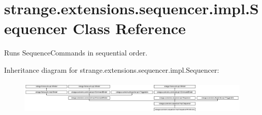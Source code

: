 \hypertarget{classstrange_1_1extensions_1_1sequencer_1_1impl_1_1_sequencer}{\section{strange.\-extensions.\-sequencer.\-impl.\-Sequencer Class Reference}
\label{classstrange_1_1extensions_1_1sequencer_1_1impl_1_1_sequencer}
}


Runs Sequence\-Commands in sequential order.  


Inheritance diagram for strange.\-extensions.\-sequencer.\-impl.\-Sequencer\-:\begin{figure}[H]
\begin{center}
\leavevmode
\includegraphics[height=1.642229cm]{classstrange_1_1extensions_1_1sequencer_1_1impl_1_1_sequencer}
\end{center}
\end{figure}
